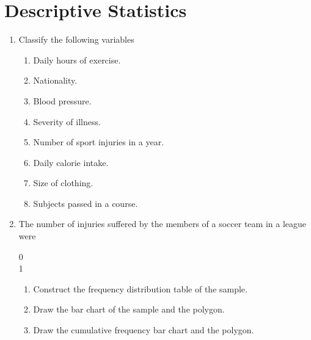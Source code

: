 
\section{Descriptive Statistics}
\begin{enumerate}[leftmargin=*]
\item Classify the following variables
\begin{enumerate}
\item Daily hours of exercise.
\item Nationality.
\item Blood pressure.
\item Severity of illness.
\item Number of sport injuries in a year.
\item Daily calorie intake.
\item Size of clothing.
\item Subjects passed in a course.
\end{enumerate}

\begin{sol}
\end{sol}

\item \label{soccer-injuries}The number of injuries suffered by the members of a soccer team in a league were
\begin{center}
0            \\
1           
\end{center}

\begin{enumerate}
\item Construct the frequency distribution table of the sample.
\item Draw the bar chart of the sample and the polygon.
\item Draw the cumulative frequency bar chart and the polygon.
\end{enumerate}


\end{enumerate}
